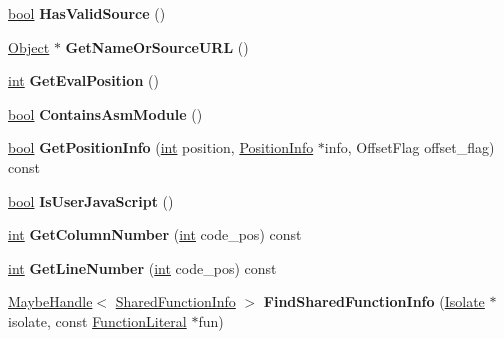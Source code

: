 \begin{DoxyCompactItemize}
\item 
\mbox{\label{classv8_1_1internal_1_1Script_a67d38e9d83011c2b609eb102f205ed4b}} 
\mbox{\hyperlink{classbool}{bool}} {\bfseries Has\+Valid\+Source} ()
\item 
\mbox{\label{classv8_1_1internal_1_1Script_a52500d3a777318d8d82ac46765cff050}} 
\mbox{\hyperlink{classv8_1_1internal_1_1Object}{Object}} $\ast$ {\bfseries Get\+Name\+Or\+Source\+U\+RL} ()
\item 
\mbox{\label{classv8_1_1internal_1_1Script_a97f047b8f9d7e133d4e7cb5ece6e1ab6}} 
\mbox{\hyperlink{classint}{int}} {\bfseries Get\+Eval\+Position} ()
\item 
\mbox{\label{classv8_1_1internal_1_1Script_a9e424a5b897029c937c3708abbab4867}} 
\mbox{\hyperlink{classbool}{bool}} {\bfseries Contains\+Asm\+Module} ()
\item 
\mbox{\label{classv8_1_1internal_1_1Script_aca8dd82f2be6ca38dd0bc12f19975d9b}} 
\mbox{\hyperlink{classbool}{bool}} {\bfseries Get\+Position\+Info} (\mbox{\hyperlink{classint}{int}} position, \mbox{\hyperlink{structv8_1_1internal_1_1Script_1_1PositionInfo}{Position\+Info}} $\ast$info, Offset\+Flag offset\+\_\+flag) const
\item 
\mbox{\label{classv8_1_1internal_1_1Script_aa05cabd3f3a7c0cf59fc20e27652aa01}} 
\mbox{\hyperlink{classbool}{bool}} {\bfseries Is\+User\+Java\+Script} ()
\item 
\mbox{\label{classv8_1_1internal_1_1Script_aef35053851fb825e5e18ac2305191ffc}} 
\mbox{\hyperlink{classint}{int}} {\bfseries Get\+Column\+Number} (\mbox{\hyperlink{classint}{int}} code\+\_\+pos) const
\item 
\mbox{\label{classv8_1_1internal_1_1Script_a48b44fffa7704ab2db471a6e2925d6fe}} 
\mbox{\hyperlink{classint}{int}} {\bfseries Get\+Line\+Number} (\mbox{\hyperlink{classint}{int}} code\+\_\+pos) const
\item 
\mbox{\label{classv8_1_1internal_1_1Script_acdf5c6bc86badaab3635fe95eae12fef}} 
\mbox{\hyperlink{classv8_1_1internal_1_1MaybeHandle}{Maybe\+Handle}}$<$ \mbox{\hyperlink{classv8_1_1internal_1_1SharedFunctionInfo}{Shared\+Function\+Info}} $>$ {\bfseries Find\+Shared\+Function\+Info} (\mbox{\hyperlink{classv8_1_1internal_1_1Isolate}{Isolate}} $\ast$isolate, const \mbox{\hyperlink{classv8_1_1internal_1_1FunctionLiteral}{Function\+Literal}} $\ast$fun)
\end{DoxyCompactItemize}
